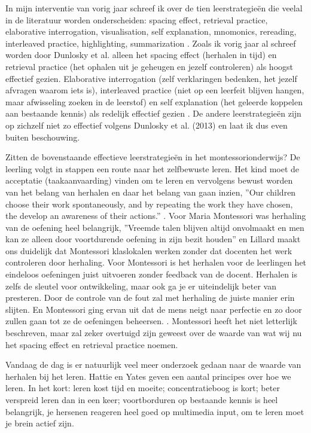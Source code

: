 \documentclass[12pt, a4paper]{article}
\begin{document}
In mijn interventie van vorig jaar schreef ik over de tien leerstrategieën die veelal in de literatuur worden onderscheiden: spacing effect, retrieval practice, elaborative interrogation, visualisation, self explanation, mnomonics, rereading, interleaved practice, highlighting, summarization \cite[p.13-14]{Marijn23}. Zoals ik vorig jaar al schreef worden door Dunlosky et al. alleen het spacing effect (herhalen in tijd) en retrieval practice (het ophalen uit je geheugen en jezelf controleren) als hoogst effectief gezien. Elaborative interrogation (zelf verklaringen bedenken, het jezelf afvragen waarom iets is), interleaved practice (niet op een leerfeit blijven hangen, maar afwisseling zoeken in de leerstof) en self explanation (het geleerde koppelen aan bestaande kennis) als redelijk effectief gezien \cite[]{dunlosky13}. De andere leerstrategieën zijn op zichzelf niet zo effectief volgens Dunlosky et al. (2013) en laat ik dus even buiten beschouwing.

Zitten de bovenstaande effectieve leerstrategieën in het montessorionderwijs? De leerling volgt in stappen een route naar het zelfbewuste leren. Het kind moet de acceptatie (taakaanvaarding) vinden om te leren en vervolgens bewust worden van het belang van herhalen en daar het belang van gaan inzien, ''Our children choose their work spontaneously, and by repeating the work they have chosen, the develop an awareness of their actions.'' \cite[p.47]{Gimbel}. Voor Maria Montessori was herhaling van de oefening heel belangrijk, ''Vreemde talen blijven altijd onvolmaakt en men kan ze alleen door voortdurende oefening in zijn bezit houden'' \cite[p. 38]{Montessori1954} en Lillard maakt ons duidelijk dat Montessori klaslokalen werken zonder dat docenten het werk controleren door herhaling. Voor Montessori is het herhalen voor de leerlingen het eindeloos oefeningen juist uitvoeren zonder feedback van de docent. Herhalen is zelfs de sleutel voor ontwikkeling, maar ook ga je er uiteindelijk beter van presteren. Door de controle van de fout zal met herhaling de juiste manier erin slijten. En Montessori ging ervan uit dat de mens neigt naar perfectie en zo door zullen gaan tot ze de oefeningen beheersen. \cite[p.203]{Lillard}. Montessori heeft het niet letterlijk beschreven, maar zal zeker overtuigd zijn geweest over de waarde van wat wij nu het spacing effect en retrieval practice noemen. 

Vandaag de dag is er natuurlijk veel meer onderzoek gedaan naar de waarde van herhalen bij het leren. Hattie en Yates geven een aantal principes over hoe we leren. In het kort: leren kost tijd en moeite; concentratieboog is kort; beter verspreid leren dan in een keer; voortborduren op bestaande kennis is heel belangrijk, je hersenen reageren heel goed op multimedia input, om te leren moet je brein actief zijn. \cite[pp. 113-115]{hattie2014}
\end{document}
